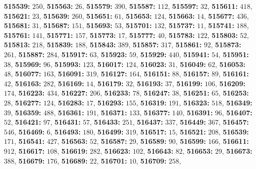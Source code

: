 \textsf{\bfseries 515539:} $250$, \textsf{\bfseries 515563:} $26$, \textsf{\bfseries 515579:} $390$, \textsf{\bfseries 515587:} $112$, \textsf{\bfseries 515597:} $32$, \textsf{\bfseries 515611:} $418$, \textsf{\bfseries 515621:} $23$, \textsf{\bfseries 515639:} $260$, \textsf{\bfseries 515651:} $61$, \textsf{\bfseries 515653:} $124$, \textsf{\bfseries 515663:} $14$, \textsf{\bfseries 515677:} $436$, \textsf{\bfseries 515681:} $31$, \textsf{\bfseries 515687:} $151$, \textsf{\bfseries 515693:} $53$, \textsf{\bfseries 515701:} $132$, \textsf{\bfseries 515737:} $11$, \textsf{\bfseries 515741:} $188$, \textsf{\bfseries 515761:} $141$, \textsf{\bfseries 515771:} $157$, \textsf{\bfseries 515773:} $17$, \textsf{\bfseries 515777:} $40$, \textsf{\bfseries 515783:} $122$, \textsf{\bfseries 515803:} $52$, \textsf{\bfseries 515813:} $218$, \textsf{\bfseries 515839:} $188$, \textsf{\bfseries 515843:} $389$, \textsf{\bfseries 515857:} $317$, \textsf{\bfseries 515861:} $92$, \textsf{\bfseries 515873:} $261$, \textsf{\bfseries 515887:} $284$, \textsf{\bfseries 515917:} $63$, \textsf{\bfseries 515923:} $59$, \textsf{\bfseries 515929:} $440$, \textsf{\bfseries 515941:} $54$, \textsf{\bfseries 515951:} $38$, \textsf{\bfseries 515969:} $96$, \textsf{\bfseries 515993:} $123$, \textsf{\bfseries 516017:} $124$, \textsf{\bfseries 516023:} $31$, \textsf{\bfseries 516049:} $62$, \textsf{\bfseries 516053:} $48$, \textsf{\bfseries 516077:} $163$, \textsf{\bfseries 516091:} $319$, \textsf{\bfseries 516127:} $164$, \textsf{\bfseries 516151:} $88$, \textsf{\bfseries 516157:} $89$, \textsf{\bfseries 516161:} $42$, \textsf{\bfseries 516163:} $282$, \textsf{\bfseries 516169:} $14$, \textsf{\bfseries 516179:} $32$, \textsf{\bfseries 516193:} $37$, \textsf{\bfseries 516199:} $106$, \textsf{\bfseries 516209:} $174$, \textsf{\bfseries 516223:} $434$, \textsf{\bfseries 516227:} $206$, \textsf{\bfseries 516233:} $78$, \textsf{\bfseries 516247:} $38$, \textsf{\bfseries 516251:} $65$, \textsf{\bfseries 516253:} $28$, \textsf{\bfseries 516277:} $124$, \textsf{\bfseries 516283:} $17$, \textsf{\bfseries 516293:} $155$, \textsf{\bfseries 516319:} $191$, \textsf{\bfseries 516323:} $518$, \textsf{\bfseries 516349:} $39$, \textsf{\bfseries 516359:} $488$, \textsf{\bfseries 516361:} $191$, \textsf{\bfseries 516371:} $133$, \textsf{\bfseries 516377:} $140$, \textsf{\bfseries 516391:} $96$, \textsf{\bfseries 516407:} $52$, \textsf{\bfseries 516421:} $97$, \textsf{\bfseries 516431:} $57$, \textsf{\bfseries 516433:} $251$, \textsf{\bfseries 516437:} $337$, \textsf{\bfseries 516449:} $367$, \textsf{\bfseries 516457:} $546$, \textsf{\bfseries 516469:} $6$, \textsf{\bfseries 516493:} $180$, \textsf{\bfseries 516499:} $319$, \textsf{\bfseries 516517:} $15$, \textsf{\bfseries 516521:} $208$, \textsf{\bfseries 516539:} $171$, \textsf{\bfseries 516541:} $427$, \textsf{\bfseries 516563:} $52$, \textsf{\bfseries 516587:} $29$, \textsf{\bfseries 516589:} $90$, \textsf{\bfseries 516599:} $166$, \textsf{\bfseries 516611:} $912$, \textsf{\bfseries 516617:} $108$, \textsf{\bfseries 516619:} $282$, \textsf{\bfseries 516623:} $102$, \textsf{\bfseries 516643:} $82$, \textsf{\bfseries 516653:} $29$, \textsf{\bfseries 516673:} $388$, \textsf{\bfseries 516679:} $176$, \textsf{\bfseries 516689:} $22$, \textsf{\bfseries 516701:} $10$, \textsf{\bfseries 516709:} $258$, 
